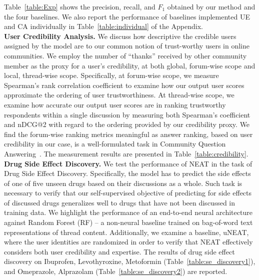 \documentclass{bmcart}
\begin{document}

Table~\ref{table:Exp} shows the precision, recall, and $F_{1}$ obtained by our method and the four baselines. We also report the performance of baselines implemented UE and CA individually in Table~\ref{table:individual} of the Appendix. \\

{\bf User Credibility Analysis.} We discuss how descriptive the credible users assigned by the model are to our common notion of trust-worthy users in online communities. 
We employ the number of ``thanks'' received by other community member as the proxy for a user's credibility, at both global, forum-wise scope and local, thread-wise scope. Specifically, at forum-wise scope, we measure Spearman's rank correlation coefficient to examine how our output user scores approximate the ordering of user trustworthiness.
At thread-wise scope, we examine how accurate our output user scores are in ranking trustworthy respondents within a single discussion by measuring both Spearman's coefficient and nDCG@2 with regard to the ordering provided by our credibility proxy. We find the forum-wise ranking metrics meaningful as answer ranking, based on user credibility in our case, is a well-formulated task in Community Question Answering~\cite{nie2017data, surdeanu2008learning,nakov2016semeval}. The measurement results are presented in Table~\ref{table:credibility}. \\ 

{\bf Drug Side Effect Discovery.} We test the performance of NEAT in the task of Drug Side Effect Discovery. Specifically, the model has to predict the side effects of one of five unseen drugs based on their discussions as a whole. Such task is necessary to verify that our self-supervised objective of predicting for side effects of discussed drugs generalizes well to
drugs that have not been discussed in training data. We highlight the performance of an end-to-end neural architecture against Random Forest (RF) -- a non-neural baseline trained on bag-of-word text representations of thread content. Additionally, we examine a baseline, uNEAT, where the user identities are randomized in order to verify that NEAT effectively considers both user credibility and expertise. The results of drug side effect discovery on Ibuprofen, Levothyroxine, Metoformin (Table~\ref{table:se_discovery1}), and Omeprazole, Alprazolam (Table~\ref{table:se_discovery2}) are reported. \\
\end{document}
